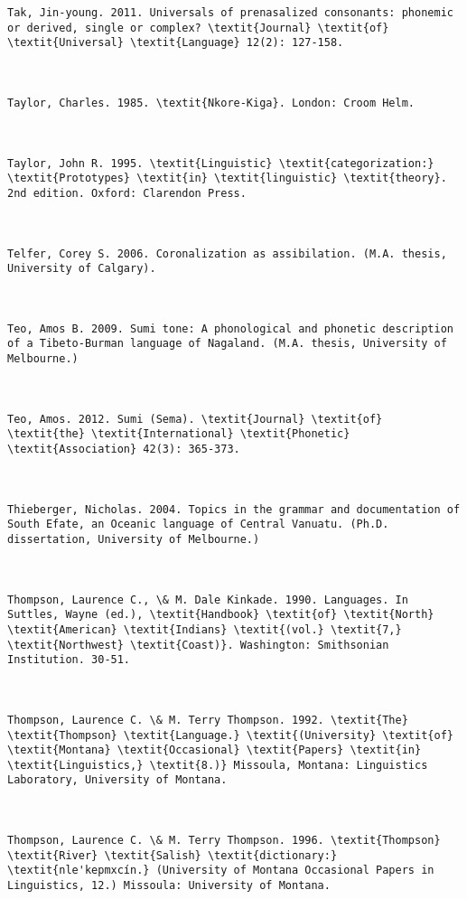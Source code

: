\begin{verbatim}
Tak, Jin-young. 2011. Universals of prenasalized consonants: phonemic or derived, single or complex? \textit{Journal} \textit{of} \textit{Universal} \textit{Language} 12(2): 127-158.



Taylor, Charles. 1985. \textit{Nkore-Kiga}. London: Croom Helm.



Taylor, John R. 1995. \textit{Linguistic} \textit{categorization:} \textit{Prototypes} \textit{in} \textit{linguistic} \textit{theory}. 2nd edition. Oxford: Clarendon Press.



Telfer, Corey S. 2006. Coronalization as assibilation. (M.A. thesis, University of Calgary).



Teo, Amos B. 2009. Sumi tone: A phonological and phonetic description of a Tibeto-Burman language of Nagaland. (M.A. thesis, University of Melbourne.)



Teo, Amos. 2012. Sumi (Sema). \textit{Journal} \textit{of} \textit{the} \textit{International} \textit{Phonetic} \textit{Association} 42(3): 365-373.



Thieberger, Nicholas. 2004. Topics in the grammar and documentation of South Efate, an Oceanic language of Central Vanuatu. (Ph.D. dissertation, University of Melbourne.)



Thompson, Laurence C., \& M. Dale Kinkade. 1990. Languages. In Suttles, Wayne (ed.), \textit{Handbook} \textit{of} \textit{North} \textit{American} \textit{Indians} \textit{(vol.} \textit{7,} \textit{Northwest} \textit{Coast)}. Washington: Smithsonian Institution. 30-51.



Thompson, Laurence C. \& M. Terry Thompson. 1992. \textit{The} \textit{Thompson} \textit{Language.} \textit{(University} \textit{of} \textit{Montana} \textit{Occasional} \textit{Papers} \textit{in} \textit{Linguistics,} \textit{8.)} Missoula, Montana: Linguistics Laboratory, University of Montana.



Thompson, Laurence C. \& M. Terry Thompson. 1996. \textit{Thompson} \textit{River} \textit{Salish} \textit{dictionary:} \textit{nle'kepmxcín.} (University of Montana Occasional Papers in Linguistics, 12.) Missoula: University of Montana.




\end{verbatim}
